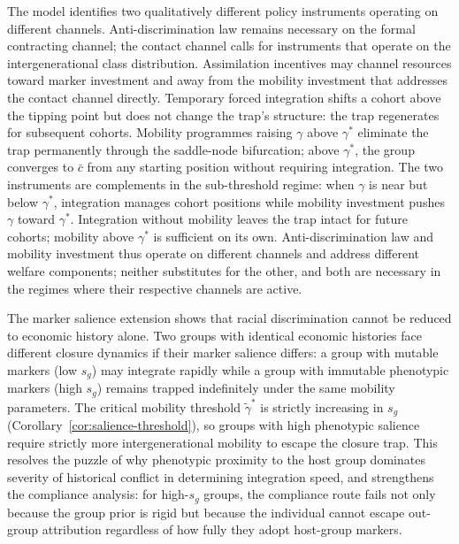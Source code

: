 \documentclass[12pt,a4paper]{article}
\theoremstyle{definition}
\numberwithin{proposition}{subsection}
\begin{document}
The model identifies two qualitatively different policy instruments
operating on different channels. Anti-discrimination law remains
necessary on the formal contracting channel; the contact channel
calls for instruments that operate on the intergenerational class
distribution. Assimilation incentives may channel resources toward
marker investment and away from the mobility
investment that addresses the contact channel directly.
Temporary forced integration shifts a cohort above the tipping point
but does not change the trap's structure: the trap regenerates for
subsequent cohorts. Mobility programmes raising
$\gamma$ above $\gamma^*$ eliminate the trap permanently through the
saddle-node bifurcation; above $\gamma^*$, the group converges to
$\bar{c}$ from any starting position without requiring integration.
The two instruments are complements in the sub-threshold regime:
when $\gamma$ is near but below $\gamma^*$, integration manages
cohort positions while mobility investment pushes $\gamma$ toward
$\gamma^*$. Integration without mobility leaves the trap intact for
future cohorts; mobility above $\gamma^*$ is sufficient on its own.
Anti-discrimination law and mobility investment thus
operate on different channels and address different welfare
components; neither substitutes for the other, and both are
necessary in the regimes where their respective channels are
active.

The marker salience extension shows that racial discrimination
cannot be reduced to economic history alone. Two groups with
identical economic histories face different closure dynamics if
their marker salience differs: a group with mutable markers (low
$s_g$) may integrate rapidly while a group with immutable phenotypic
markers (high $s_g$) remains trapped indefinitely under the same
mobility parameters. The critical mobility threshold
$\tilde{\gamma}^*$ is strictly increasing in $s_g$
(Corollary~\ref{cor:salience-threshold}), so groups with high
phenotypic salience require strictly more intergenerational
mobility to escape the closure trap. This resolves the puzzle of
why phenotypic proximity to the host group dominates severity of
historical conflict in determining integration speed, and
strengthens the compliance analysis: for high-$s_g$ groups, the
compliance route fails not only because the group prior is rigid
but because the individual cannot escape out-group attribution
regardless of how fully they adopt host-group markers.
\end{document}
